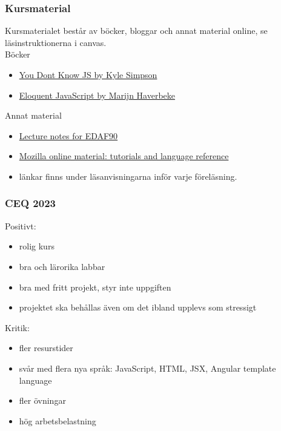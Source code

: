 \documentclass[aspectratio=1610]{beamer}
\begin{document}
\begin{frame}
  \frametitle{Kursmaterial}

Kursmaterialet består av böcker, bloggar och annat material online, se läsinstruktionerna i canvas.
\\ \vspace{3mm}
Böcker
\begin{itemize}
\item \href{https://github.com/getify/You-Dont-Know-JS}{You Dont Know JS by Kyle Simpson} 
\item \href{https://eloquentjavascript.net/}{Eloquent JavaScript by Marijn Haverbeke}
\end{itemize}

Annat material
\begin{itemize}
\item \href{http://fileadmin.cs.lth.se/cs/Education/EDAF90/lectures/lecture-notes.pdf}{Lecture notes for EDAF90}
\item \href{https://developer.mozilla.org/en-US/docs/Learn}{Mozilla online material: tutorials and language reference}
\item länkar finns under läsanvisningarna inför varje föreläsning.
\end{itemize}

\end{frame}

\begin{frame}
  \frametitle{CEQ 2023}
Positivt:
\begin{itemize}
  \item rolig kurs
  \item bra och lärorika labbar
  \item bra med fritt projekt, styr inte uppgiften
  \item projektet ska behållas även om det ibland upplevs som stressigt
\end{itemize}
\vspace{2mm}
Kritik:
\begin{itemize}
  \item fler resurstider
  \item svår med flera nya språk: JavaScript, HTML, JSX, Angular template language
  \item fler övningar
  \item hög arbetsbelastning
\end{itemize}
\end{frame}
\end{document}
